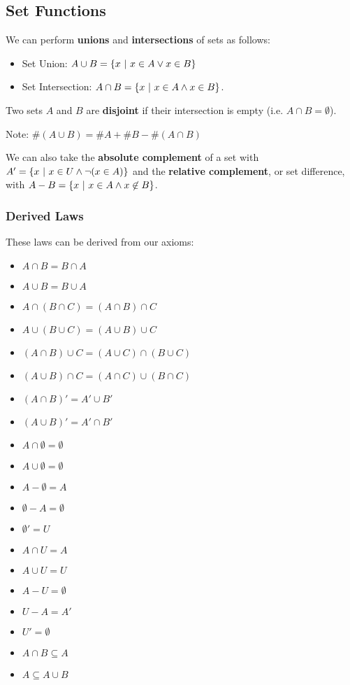 \documentclass[12pt]{article}
\begin{document}
\subsection*{Set Functions}
We can perform {\bf unions} and {\bf intersections} of sets as follows:
\begin{itemize}
\item Set Union: $A \cup B = \{ x \ |\  x \in A \lor x \in B \}$
\item Set Intersection: $A \cap B = \{ x \ |\  x \in A \land x \in B \}$.
\end{itemize}

Two sets $A$ and $B$ are {\bf disjoint} if their intersection is empty (i.e. $A \cap B = \emptyset$).

Note: $\#(A \cup B) = \#A + \#B − \#(A \cap B)$

We can also take the {\bf absolute complement} of a set with $A' = \{ x \ |\  x \in U \land \neg(x \in A) \}$ and the {\bf relative complement}, or set difference, with $A - B = \{ x \ |\  x \in A \land x \not\in B \}$.

\subsubsection*{Derived Laws}
These laws can be derived from our axioms:
\begin{itemize}
\item $A \cap B = B \cap A$
\item $A \cup B = B \cup A$
\item $A \cap (B \cap C) = (A \cap B) \cap C$
\item $A \cup (B \cup C) = (A \cup B) \cup C$
\item $(A \cap B) \cup C = (A \cup C) \cap (B \cup C)$
\item $(A \cup B) \cap C = (A \cap C) \cup (B \cap C)$
\item $(A \cap B)' = A' \cup B'$
\item $(A \cup B)' = A' \cap B'$
\item $A \cap \emptyset = \emptyset$
\item $A \cup \emptyset = \emptyset$
\item $A - \emptyset = A$
\item $\emptyset - A = \emptyset$
\item $\emptyset' = U$
\item $A \cap U = A$
\item $A \cup U = U$
\item $A - U = \emptyset$
\item $U - A = A'$
\item $U' = \emptyset$
\item $A \cap B \subseteq A$
\item $A \subseteq A \cup B$
\end{itemize}
\end{document}
